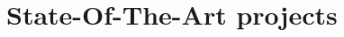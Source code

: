 \documentclass[a4paper,12pt,titlepage, openany, openright, cleardoubleempty]{scrreprt} %
\begin{document}
\chapter{State-Of-The-Art projects}



%



%


\cleardoublepage
{}





\cleardoublepage
{}

\end{document}

